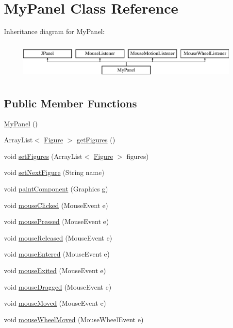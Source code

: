 \hypertarget{class_my_panel}{}\section{My\+Panel Class Reference}
\label{class_my_panel}
Inheritance diagram for My\+Panel\+:\begin{figure}[H]
\begin{center}
\leavevmode
\includegraphics[height=1.985816cm]{class_my_panel}
\end{center}
\end{figure}
\subsection*{Public Member Functions}
\begin{DoxyCompactItemize}
\item 
\mbox{\hyperlink{class_my_panel_a9395d78dbd3ccb9159bcdfd8fa54bf62}{My\+Panel}} ()
\item 
Array\+List$<$ \mbox{\hyperlink{class_figure}{Figure}} $>$ \mbox{\hyperlink{class_my_panel_a5973b6511dee7060ee7cc5e49b37c836}{get\+Figures}} ()
\item 
void \mbox{\hyperlink{class_my_panel_a3a0c9daa133938d79c9750bd684967e6}{set\+Figures}} (Array\+List$<$ \mbox{\hyperlink{class_figure}{Figure}} $>$ figures)
\item 
void \mbox{\hyperlink{class_my_panel_a3a1214eb7ae2f5d5bb1cdb21d8a4b097}{set\+Next\+Figure}} (String name)
\item 
void \mbox{\hyperlink{class_my_panel_a01d8184b14a097e845b1845ddf3e4d7d}{paint\+Component}} (Graphics g)
\item 
void \mbox{\hyperlink{class_my_panel_a657ce352f2f06f2cf535b08019849bef}{mouse\+Clicked}} (Mouse\+Event e)
\item 
void \mbox{\hyperlink{class_my_panel_ad1ac4015693658076ffa37d8d3cc16dc}{mouse\+Pressed}} (Mouse\+Event e)
\item 
void \mbox{\hyperlink{class_my_panel_a975c43d6d03a6dce44f1791bce757839}{mouse\+Released}} (Mouse\+Event e)
\item 
void \mbox{\hyperlink{class_my_panel_afaf9c657c61bebb715330371b17b9852}{mouse\+Entered}} (Mouse\+Event e)
\item 
void \mbox{\hyperlink{class_my_panel_a86b4f660c427fa44902e777f26d5ea54}{mouse\+Exited}} (Mouse\+Event e)
\item 
void \mbox{\hyperlink{class_my_panel_a89449fea451e2350cdec8bd638d36344}{mouse\+Dragged}} (Mouse\+Event e)
\item 
void \mbox{\hyperlink{class_my_panel_ae26f94cb4b562a2c26928914de71b76e}{mouse\+Moved}} (Mouse\+Event e)
\item 
void \mbox{\hyperlink{class_my_panel_ad512efaf729c549e397b58498bff6043}{mouse\+Wheel\+Moved}} (Mouse\+Wheel\+Event e)
\end{DoxyCompactItemize}


